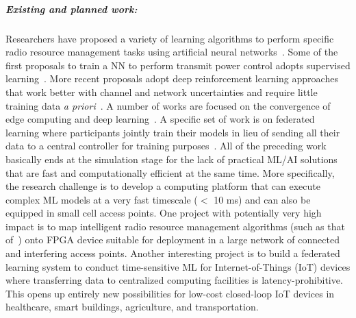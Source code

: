 \subparagraph*{Existing and planned work:} Researchers have proposed a variety of learning algorithms to perform specific radio resource management tasks using artificial neural networks~\cite{
calabrese2018learning,
challita2018proactive,
huang2020deep,
zhu2020toward}.
Some of the first proposals to train a NN to perform transmit power control adopts supervised learning~\cite{
sun2018learning,
liang2019towards}.  More recent proposals adopt deep reinforcement learning approaches that work better with channel and network uncertainties and require little training data {\em a priori}~\cite{nasir2020deep,
zhao2019deep,
liang2019spectrum,
meng2020power}.
A number of works are focused on the convergence of edge computing and deep learning~\cite{chen2019deep,
zhang2019deep,wang2020convergence}.  A specific set of work is on federated learning where participants jointly train their models in lieu of sending all their data to a central controller for training purposes~\cite{niknam2020federated,
amiri2020federated,
chen2021convergence,
ren2020scheduling}.
All of the preceding work basically ends at the simulation stage for the lack of practical ML/AI solutions that are fast and computationally efficient at the same time.  More specifically, the research challenge is to develop a computing platform that can execute complex ML models at a very fast timescale ($<$ 10 ms) and can also be equipped in small cell access points.
One project with potentially very high impact is to map intelligent radio resource management algorithms (such as that of~\cite{nasir2020deep}) onto FPGA device suitable for deployment in a large network of connected and interfering access points.
Another interesting project is to build a federated learning system to conduct time-sensitive ML for Internet-of-Things (IoT) devices where transferring data to centralized computing facilities is latency-prohibitive.  This opens up entirely new possibilities for low-cost closed-loop IoT devices in healthcare, smart buildings, agriculture, and transportation.

